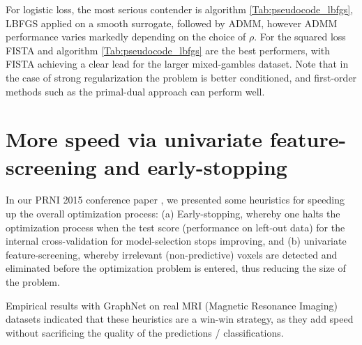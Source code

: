 For logistic loss, the most serious contender is
algorithm \ref{Tab:pseudocode_lbfgs}, LBFGS applied on a smooth
surrogate, followed by ADMM, however ADMM performance
varies markedly depending on the choice of $\rho$. For the squared loss
FISTA and algorithm \ref{Tab:pseudocode_lbfgs} are the best performers,
with FISTA achieving a clear lead for the larger mixed-gambles dataset.
Note that in the case of strong regularization the problem is better
conditioned, and first-order methods such as the
primal-dual approach can perform well.

\section{More speed via univariate feature-screening and early-stopping}
In our PRNI 2015 conference paper   \citep{dohmatob2015speeding}, we presented some heuristics for speeding up the overall optimization process: (a) Early-stopping, whereby one  halts
the optimization process when the test score (performance on left-out
data) for the internal cross-validation for model-selection stops
improving, and (b) univariate feature-screening, whereby irrelevant
(non-predictive) voxels are detected and eliminated before the
optimization problem is entered, thus reducing the size of the
problem.

Empirical results with GraphNet on real MRI (Magnetic
Resonance Imaging)
datasets indicated that these heuristics are a win-win strategy, as
they add speed without sacrificing the quality of the predictions
/ classifications.

